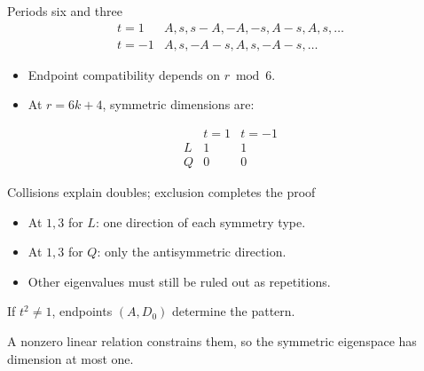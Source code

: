 \documentclass{beamer}
\begin{document}
\begin{frame}{Periods six and three}
\[
\begin{array}{c|l}
t=1&A,s,s-A,-A,-s,A-s,A,s,\ldots\\
t=-1&A,s,-A-s,A,s,-A-s,\ldots
\end{array}
\]
\begin{itemize}
\item Endpoint compatibility depends on $r\bmod6$.
\item At $r=6k+4$, symmetric dimensions are:
\end{itemize}
\[
\begin{array}{c|cc}&t=1&t=-1\\\hline L&1&1\\Q&0&0\end{array}
\]
\end{frame}
\begin{frame}{Collisions explain doubles; exclusion completes the proof}
\begin{itemize}
\item At $1,3$ for $L$: one direction of each symmetry type.
\item At $1,3$ for $Q$: only the antisymmetric direction.
\item Other eigenvalues must still be ruled out as repetitions.
\end{itemize}
If $t^2\ne1$, endpoints $(A,D_0)$ determine the pattern.

A nonzero linear relation constrains them, so the symmetric eigenspace has dimension at most one.
\end{frame}
\end{document}
